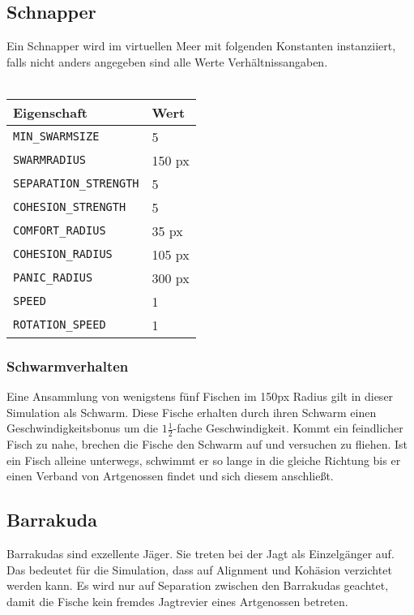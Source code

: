 \documentclass[11pt]{article}
\begin{document}
\subsection{Schnapper}
Ein Schnapper wird im virtuellen Meer mit folgenden Konstanten instanziiert, falls nicht anders angegeben sind alle Werte Verhältnissangaben. \\\\
\begin{tabular}{|l|l|}
\hline
	\textbf{Eigenschaft} & \textbf{Wert}\\
\hline
\hline
	\lstinline[]$MIN_SWARMSIZE$  & 5\\
\hline
	\lstinline[]$SWARMRADIUS$ & 150 px\\
\hline
	\lstinline[]$SEPARATION_STRENGTH$ & 5\\
\hline
	\lstinline[]$COHESION_STRENGTH$ & 5\\
\hline
	\lstinline[]$COMFORT_RADIUS$ & 35 px\\
\hline
	\lstinline[]$COHESION_RADIUS$ & 105 px\\
\hline
	\lstinline[]$PANIC_RADIUS$ & 300 px\\
\hline
	\lstinline[]$SPEED$ & 1\\
\hline
	\lstinline[]$ROTATION_SPEED$ & 1\\
\hline
\end{tabular}

\subsubsection{Schwarmverhalten}
Eine Ansammlung von wenigstens fünf Fischen im 150px Radius gilt in dieser Simulation als Schwarm. Diese Fische erhalten durch ihren Schwarm einen Geschwindigkeitsbonus um die \( 1 \frac{1}{2} \)-fache Geschwindigkeit.
Kommt ein feindlicher Fisch zu nahe, brechen die Fische den Schwarm auf und versuchen zu fliehen. Ist ein Fisch alleine unterwegs, schwimmt er so lange in die gleiche Richtung bis er einen Verband von Artgenossen findet und sich diesem anschließt.

\subsection{Barrakuda}
Barrakudas sind exzellente Jäger. Sie treten bei der Jagt als Einzelgänger auf. Das bedeutet für die Simulation, dass auf Alignment und Kohäsion verzichtet werden kann. Es wird nur auf Separation zwischen den Barrakudas geachtet, damit die Fische kein fremdes Jagtrevier eines Artgenossen betreten.\\
\end{document}
